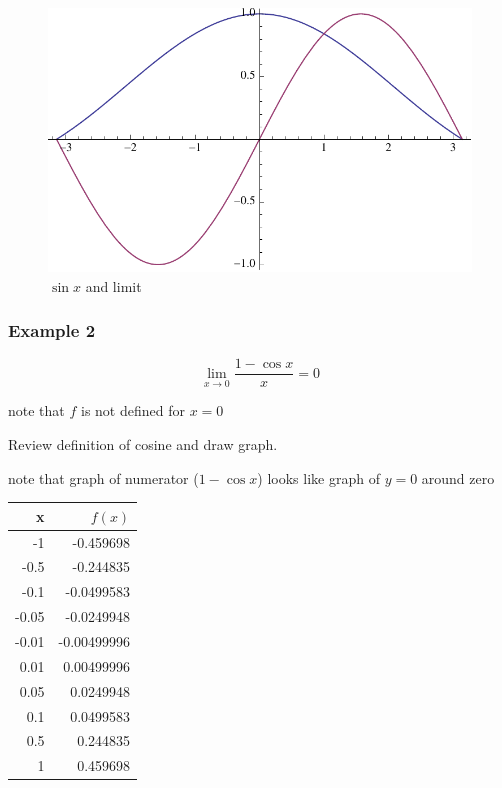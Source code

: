 \documentclass[letterpaper, landscape]{exam}
\begin{document}
  \begin{figure}[H]
    \centering
    \includegraphics[scale = 0.5]{example1.pdf}
    \caption{$\sin x$ and limit}
    \label{fig:example1}
  \end{figure}

  \subsubsection{Example 2}
  \[
    \lim_{x \to 0} \frac{1 - \cos x}{x} = 0
  \]

  \begin{itemize*}
    \item note that $f$ is not defined for $x = 0$
    \item Review definition of cosine and draw graph.
    \item note that graph of numerator ($1 - \cos x$) looks like graph of $y =
      0$ around zero
  \end{itemize*}

  \begin{tabular}[H]{rr}
    \toprule
    x     & $f(x)$ \\
    \midrule
    -1    & -0.459698 \\
    -0.5  & -0.244835 \\
    -0.1  & -0.0499583 \\
    -0.05 & -0.0249948 \\
    -0.01 & -0.00499996 \\
    0.01  & 0.00499996 \\
    0.05  & 0.0249948 \\
    0.1   & 0.0499583 \\
    0.5   & 0.244835 \\
    1     & 0.459698 \\
    \bottomrule
  \end{tabular}
\end{document}
